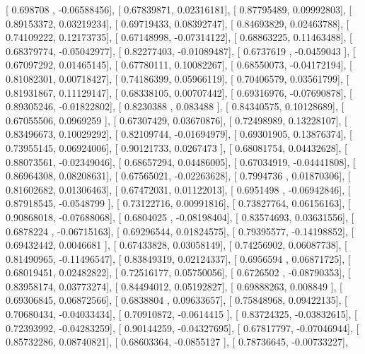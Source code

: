 \documentclass{article}
\begin{document}
       [ 0.698708  , -0.06588456],
       [ 0.67839871,  0.02316181],
       [ 0.87795489,  0.09992803],
       [ 0.89153372,  0.03219234],
       [ 0.69719433,  0.08392747],
       [ 0.84693829,  0.02463788],
       [ 0.74109222,  0.12173735],
       [ 0.67148998, -0.07314122],
       [ 0.68863225,  0.11463488],
       [ 0.68379774, -0.05042977],
       [ 0.82277403, -0.01089487],
       [ 0.6737619 , -0.0459043 ],
       [ 0.67097292,  0.01465145],
       [ 0.67780111,  0.10082267],
       [ 0.68550073, -0.04172194],
       [ 0.81082301,  0.00718427],
       [ 0.74186399,  0.05966119],
       [ 0.70406579,  0.03561799],
       [ 0.81931867,  0.11129147],
       [ 0.68338105,  0.00707442],
       [ 0.69316976, -0.07690878],
       [ 0.89305246, -0.01822802],
       [ 0.8230388 ,  0.083488  ],
       [ 0.84340575,  0.10128689],
       [ 0.67055506,  0.0969259 ],
       [ 0.67307429,  0.03670876],
       [ 0.72498989,  0.13228107],
       [ 0.83496673,  0.10029292],
       [ 0.82109744, -0.01694979],
       [ 0.69301905,  0.13876374],
       [ 0.73955145,  0.06924006],
       [ 0.90121733,  0.0267473 ],
       [ 0.68081754,  0.04432628],
       [ 0.88073561, -0.02349046],
       [ 0.68657294,  0.04486005],
       [ 0.67034919, -0.04441808],
       [ 0.86964308,  0.08208631],
       [ 0.67565021, -0.02263628],
       [ 0.7994736 ,  0.01870306],
       [ 0.81602682,  0.01306463],
       [ 0.67472031,  0.01122013],
       [ 0.6951498 , -0.06942846],
       [ 0.87918545, -0.0548799 ],
       [ 0.73122716,  0.00991816],
       [ 0.73827764,  0.06156163],
       [ 0.90868018, -0.07688068],
       [ 0.6804025 , -0.08198404],
       [ 0.83574693,  0.03631556],
       [ 0.6878224 , -0.06715163],
       [ 0.69296544,  0.01824575],
       [ 0.79395577, -0.14198852],
       [ 0.69432442,  0.0046681 ],
       [ 0.67433828,  0.03058149],
       [ 0.74256902,  0.06087738],
       [ 0.81490965, -0.11496547],
       [ 0.83849319,  0.02124337],
       [ 0.6956594 ,  0.06871725],
       [ 0.68019451,  0.02482822],
       [ 0.72516177,  0.05750056],
       [ 0.6726502 , -0.08790353],
       [ 0.83958174,  0.03773274],
       [ 0.84494012,  0.05192827],
       [ 0.69888263,  0.008849  ],
       [ 0.69306845,  0.06872566],
       [ 0.6838804 ,  0.09633657],
       [ 0.75848968,  0.09422135],
       [ 0.70680434, -0.04033434],
       [ 0.70910872, -0.0614415 ],
       [ 0.83724325, -0.03832615],
       [ 0.72393992, -0.04283259],
       [ 0.90144259, -0.04327695],
       [ 0.67817797, -0.07046944],
       [ 0.85732286,  0.08740821],
       [ 0.68603364, -0.0855127 ],
       [ 0.78736645, -0.00733227],
\end{document}
